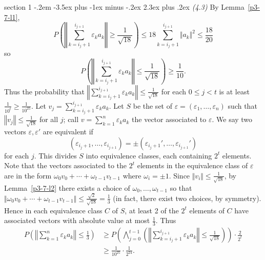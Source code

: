 \documentclass[12pt]{article}
\makeatletter
\theoremstyle{norm}
\newcommand{\rc}[1]{\frac{1}{#1}}
\newcommand{\ep}[0]{\varepsilon}
\newcommand{\om}[0]{\omega}
\newcommand{\pa}[1]{\left( {#1} \right)}
\newenvironment{problem}{\@startsection
       {section}
       {1}
       {-.2em}
       {-3.5ex plus -1ex minus -.2ex}
       {2.3ex plus .2ex}
       {\pagebreak[3]%
       \large\bf\noindent{Problem }
       }
       }
       {%
       }
\makeatother
\begin{document}
\begin{problem} {\it (4.3)}
By Lemma~\ref{p3-7-l1},
\[
P\pa{\left\Vert\sum_{k=i_j+1}^{i_{j+1}} \ep_ka_k\right\Vert\ge \rc{\sqrt {18}}}\le18\sum_{k=i_j+1}^{i_{j+1}} \Vert a_k\Vert^2\le \frac{18}{20}
\]
so 
\[
P\pa{\left\Vert\sum_{k=i_j+1}^{i_{j+1}} \ep_ka_k\right\Vert\le \rc{\sqrt {18}}}\ge \frac{1}{10}.
\]
Thus the probability that $\left\Vert\sum_{k=i_j+1}^{i_{j+1}} \ep_ka_k\right\Vert\le \rc{\sqrt {18}}$ for each $0\le j<t$ is at least $\rc{10^t}\ge \rc{10^{25}}$. 
Let $v_j=\sum_{k=i_j+1}^{i_{j+1}} \ep_ka_k$. 
Let $S$ be the set of $\ep=(\ep_1,\ldots, \ep_n)$ such that $\left\Vert v_j\right\Vert\le \rc{\sqrt {18}}$ for all $j$; call $v=\sum_{k=1}^n \ep_ka_k$ the vector associated to $\ep$. 
We say two vectors $\ep,\ep'$ are equivalent if
\[
(\ep_{i_j+1},\ldots, \ep_{i_{j+1}})=\pm(\ep_{i_j+1}',\ldots, \ep_{i_{j+1}}')
\]
for each $j$. This divides $S$ into equivalence classes, each containing $2^t$ elements. Note that the vectors associated to the $2^t$ elements in the equivalence class of $\ep$ are in the form $\om_0v_0+\cdots +\om_{t-1}v_{t-1}$ where $\om_i=\pm 1$. Since $\Vert v_i\Vert \le \rc{\sqrt{18}}$, by Lemma~\ref{p3-7-l2} there exists a choice of $\om_0,\ldots, \om_{t-1}$ so that $\Vert \om_0v_0+\cdots+ \om_{t-1}v_{t-1}\Vert \le\frac{\sqrt 2}{\sqrt{18}}=\rc{3}$ (in fact, there exist two choices, by symmetry). Hence in each equivalence class $C$ of $S$, at least 2 of the $2^t$ elements of $C$ have associated vectors with absolute value at most $\rc{3}$. Thus
\begin{align*}
P\pa{
\left\Vert\sum_{k=1}^n \ep_ka_k\right\Vert\le \rc 3
}&\ge P\pa{\bigwedge_{j=0}^{t-1}\pa{\left\Vert\sum_{k=i_j+1}^{i_{j+1}} \ep_ka_k\right\Vert\le \rc{\sqrt {18}}}}\cdot \frac{2}{2^t}\\
&\ge\frac{1}{10^{25}}\cdot \rc{2^{24}}.
\end{align*}
\end{problem}
\end{document}
